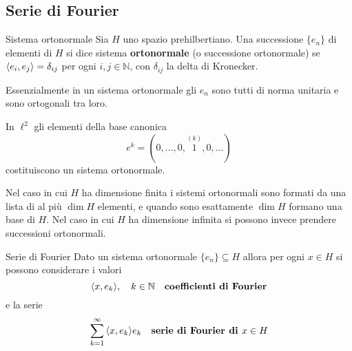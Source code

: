 \subsection{Serie di Fourier}
\begin{definition}{Sistema ortonormale}
    Sia \(H\) uno spazio prehilbertiano. Una successione \(\{e_{n}\} \) di
    elementi di \(H\) si dice sistema \textbf{ortonormale} (o successione
    ortonormale) se \({\left\langle e_{i}, e_{j}\right\rangle} = \delta_{ij}\) per ogni \(i, j \in
    \mathbb{N}\), con \(\delta_{ij}\) la delta di Kronecker.
\end{definition}
Essenzialmente in un sistema ortonormale gli \(e_{n}\) sono tutti di norma
unitaria e sono ortogonali tra loro.
\begin{example}
    In \(\ell^2\) gli elementi della base canonica 
    \[
        e^{k} = (0, \ldots, 0, \overset{(k)}{1}, 0, \ldots)
    \]
    costituiscono un sistema ortonormale.
\end{example}
\begin{remark}
    Nel caso in cui \(H\) ha dimensione finita i sistemi ortonormali 
    sono formati da una lista di al più \(\dim H\) elementi, e quando sono esattamente
    \(\dim H\) formano una base di \(H\). Nel caso in cui \(H\) ha
    dimensione infinita si possono invece prendere successioni ortonormali.
\end{remark}
\begin{definition}[label=def:fourier]{Serie di Fourier}
    Dato un sistema ortonormale \(\{e_{n}\} \subseteq H \) allora per ogni \(x
    \in H\) si possono considerare i valori \[{\left\langle x, e_{k}\right\rangle}, \quad k \in
    \mathbb{N}\quad \text{\textbf{coefficienti di Fourier}}\] e la serie
    \[
      \sum_{k=1}^{\infty} {\left\langle x, e_{k}\right\rangle} e_{k} \quad \text{\textbf{serie di
      Fourier di }} x \in H
    \]
\end{definition}

